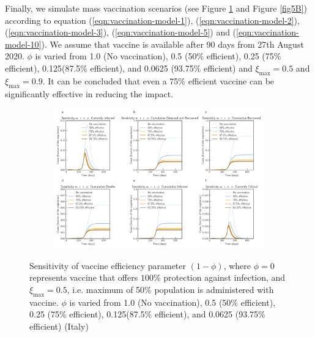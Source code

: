 \documentclass[authoryear,preprint]{elsarticle}
\begin{document}
Finally, we simulate mass vaccination scenarios (see Figure \ref{fig5A} and Figure \ref{fig5B}) according to equation (\ref{eqn:vaccination-model-1}), (\ref{eqn:vaccination-model-2}), (\ref{eqn:vaccination-model-3}), (\ref{eqn:vaccination-model-5}) and (\ref{eqn:vaccination-model-10}). We assume that vaccine is available after 90 days from 27th August 2020. $\phi$ is varied from 1.0 (No vaccination), 0.5 (50\% efficient), 0.25 (75\% efficient), 0.125(87.5\% efficient), and 0.0625 (93.75\% efficient) and $\xi_{\max} = 0.5$ and $\xi_{\max} = 0.9$. It can be concluded that even a 75\% efficient vaccine can be significantly effective in reducing the impact.

\begin{figure}[t!]
	\centering
	\begin{subfigure}[b]{\textwidth}
		\centering
		\includegraphics[width=1\linewidth]{Italy_scenario_vaccination0.5.pdf}
	\end{subfigure}
	\caption{Sensitivity of vaccine efficiency parameter $(1-\phi)$, where $\phi = 0$ represents vaccine that offers $100\%$ protection against infection, and $\xi_{\max} = 0.5$, i.e. maximum of 50\% population is administered with vaccine. $\phi$ is varied from 1.0 (No vaccination), 0.5 (50\% efficient), 0.25 (75\% efficient), 0.125(87.5\% efficient), and 0.0625 (93.75\% efficient) (Italy)}
	\label{fig5A} 
\end{figure}
\end{document}
